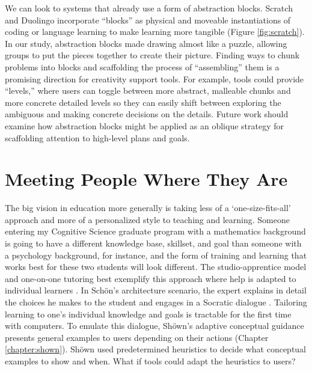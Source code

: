 We can look to systems that already use a form of abstraction blocks. Scratch \cite{Resnick2009} and Duolingo \cite{von2013duolingo} incorporate ``blocks'' as physical and moveable instantiations of coding or language learning to make learning more tangible (Figure \ref{fig:scratch}). In our study, abstraction blocks made drawing almost like a puzzle, allowing groups to put the pieces together to create their picture. Finding ways to chunk problems into blocks and scaffolding the process of ``assembling'' them is a promising direction for creativity support tools. For example, tools could provide ``levels,'' where users can toggle between more abstract, malleable chunks and more concrete detailed levels so they can easily shift between exploring the ambiguous and making concrete decisions on the details. Future work should examine how abstraction blocks might be applied as an oblique strategy for scaffolding attention to high-level plans and goals. 

\section{Meeting People Where They Are}
The big vision in education more generally is taking less of a `one-size-fits-all' approach and more of a personalized style to teaching and learning. Someone entering my Cognitive Science graduate program with a mathematics background is going to have a different knowledge base, skillset, and goal than someone with a psychology background, for instance, and the form of training and learning that works best for these two students will look different. The studio-apprentice model and one-on-one tutoring best exemplify this approach where help is adapted to individual learners \cite{bloom1984,Chi2001,schon1984reflective}. In Sch{\"o}n's architecture scenario, the expert explains in detail the choices he makes to the student and engages in a Socratic dialogue \cite{schon1984reflective}. Tailoring learning to one's individual knowledge and goals is tractable for the first time with computers. To emulate this dialogue, Sh{\"o}wn's adaptive conceptual guidance presents general examples to users depending on their actions (Chapter \ref{chapter:shown}). Sh{\"o}wn used predetermined heuristics to decide what conceptual examples to show and when. What if tools could adapt the heuristics to users? 


